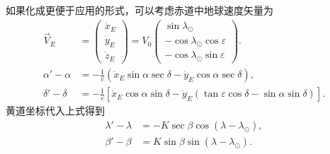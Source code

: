 \documentclass[11pt, a4paper, oneside]{ctexart}
\numberwithin{equation}{subsection}
\begin{document}
如果化成更便于应用的形式，可以考虑赤道中地球速度矢量为
\begin{align}
\vec V_E&=\begin{pmatrix}
\dot x_E\\
\dot y_E\\
\dot z_E
\end{pmatrix}=V_0\begin{pmatrix}
\sin\lambda_\odot\\
-\cos\lambda_\odot\cos\varepsilon\\
-\cos\lambda_\odot\sin\varepsilon
\end{pmatrix}.\\
\alpha'-\alpha&=-\frac1c\left(\dot x_E\sin\alpha\sec\delta-\dot y_E\cos\alpha\sec\delta\right),\\
\delta'-\delta&=-\frac1c\left[\dot x_E\cos\alpha\sin\delta-\dot y_E\left(\tan\varepsilon\cos\delta-\sin\alpha\sin\delta\right)\right].
\end{align}
黄道坐标代入上式得到
\begin{align}
\lambda'-\lambda&=-K\sec\beta\cos\left(\lambda-\lambda_\odot\right),\\
\beta'-\beta&=K\sin\beta\sin\left(\lambda-\lambda_\odot\right).
\end{align}
\end{document}
